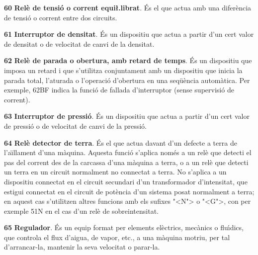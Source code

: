 \begin{multicols}{2}
\begin{list}{}
\item[\textbf{60}]   
\textbf{Rel\`{e} de tensi\'{o} o corrent equi{\l.l}ibrat}. \'{E}s el que actua amb una difer\`{e}ncia de tensi\'{o} o
corrent entre dos circuits.

\item[\textbf{61}] 
 \textbf{Interruptor de densitat}. \'{E}s un dispositiu que actua a partir d'un cert valor de densitat o de velocitat de canvi de la densitat.


\item[\textbf{62}]   
\textbf{Rel\`{e} de
parada o obertura, amb retard de temps}. \'{E}s un dispositiu que imposa un retard i que s'utilitza
conjuntament amb un dispositiu que inicia la parada total, l'aturada o l'operaci\'{o}
d'obertura en una seq\"{u}\`{e}ncia autom\`{a}tica. Per exemple, 62BF indica la funci\'{o} de fallada d'interruptor (sense supervisi\'{o} de corrent).

\item[\textbf{63}]   
\textbf{Interruptor de pressi\'{o}}. \'{E}s un dispositiu que actua a partir d'un cert valor de pressi\'{o} o de velocitat de canvi de la pressi\'{o}.

\item[\textbf{64}]    
\textbf{Rel\`{e} detector de terra}.
\'{E}s el que actua davant d'un defecte a terra de l'a\"{\i}llament d'una
m\`{a}quina. Aquesta funci\'{o} s'aplica nom\'{e}s a un rel\`{e} que detecti el pas
del corrent des de la carcassa  d'una m\`{a}quina a terra, o a un rel\`{e}
que detecti un terra en un circuit normalment no connectat a terra. No
 s'aplica a un dispositiu connectat en el circuit secundari d'un
transformador d'intensitat, que estigui connectat en el circuit de
pot\`{e}ncia d'un sistema posat normalment a terra; en aquest cas s'utilitzen altres funcions amb els sufixes {"<}N{">} o {"<}G{">}, con  per exemple 51N en el cas d'un rel\`{e} de sobreintensitat.

\item[\textbf{65}]   
\textbf{Regulador}. \'{E}s un equip format per elements
el\`{e}ctrics, mec\`{a}nics o flu\'{\i}dics,  que controla el flux d'aigua, de
vapor, etc.,  a una m\`{a}quina motriu, per tal d'arrancar-la, mantenir
la seva velocitat o parar-la.


\end{list}
\end{multicols}

